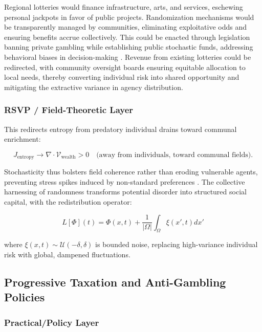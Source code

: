 \documentclass[11pt]{article}
\begin{document}
Regional lotteries would finance infrastructure, arts, and services, eschewing personal jackpots in favor of public projects. Randomization mechanisms would be transparently managed by communities, eliminating exploitative odds and ensuring benefits accrue collectively. This could be enacted through legislation banning private gambling while establishing public stochastic funds, addressing behavioral biases in decision-making \citep{bernheim2005behavioral}. Revenue from existing lotteries could be redirected, with community oversight boards ensuring equitable allocation to local needs, thereby converting individual risk into shared opportunity and mitigating the extractive variance in agency distribution.

\subsubsection{RSVP / Field-Theoretic Layer}

This redirects entropy from predatory individual drains toward communal enrichment:

\begin{equation}
J_{\text{entropy}} \to \nabla \cdot \mathcal{V}_{\text{wealth}} > 0 \quad \text{(away from individuals, toward communal fields).}
\end{equation}

Stochasticity thus bolsters field coherence rather than eroding vulnerable agents, preventing stress spikes induced by non-standard preferences \citep{bernheim2005behavioral}. The collective harnessing of randomness transforms potential disorder into structured social capital, with the redistribution operator:

\begin{equation}
\hat{L}[\Phi](t) = \Phi(x, t) + \frac{1}{|\Omega|} \int_{\Omega} \xi(x', t)  dx'
\end{equation}

where $\xi(x, t) \sim \mathcal{U}(-\delta, \delta)$ is bounded noise, replacing high-variance individual risk with global, dampened fluctuations.

\subsection{Progressive Taxation and Anti-Gambling Policies}

\subsubsection{Practical/Policy Layer}
\end{document}
